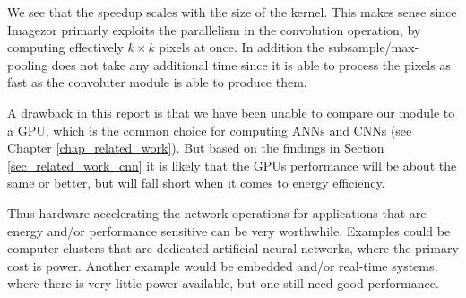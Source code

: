 We see that the speedup scales with the size of the kernel. This makes sense since Imagezor primarly exploits the parallelism in the convolution operation, by computing effectively $ k \times k $ pixels at once. In addition the subsample/max-pooling does not take any additional time since it is able to process the pixels as fast as the convoluter module is able to produce them.   

A drawback in this report is that we have been unable to compare our module to a GPU, which is the common choice for computing ANNs and CNNs (see Chapter \ref{chap_related_work}). But based on the findings in Section \ref{sec_related_work_cnn} it is likely that the GPUs performance will be about the same or better, but will fall short when it comes to energy efficiency. 

Thus hardware accelerating the network operations for applications that are energy and/or performance sensitive can be very worthwhile. Examples could be computer clusters that are dedicated artificial neural networks, where the primary cost is power. Another example would be embedded and/or real-time systems, where there is very little power available, but one still need good performance. 
